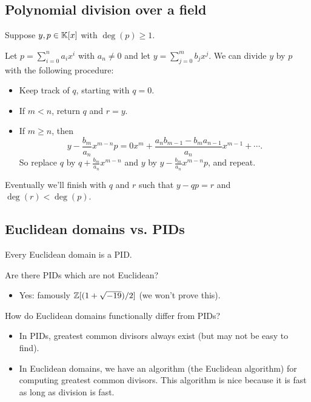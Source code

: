 \documentclass[12pt,letterpaper]{report}
\begin{document}
\pagebreak
\subsection{Polynomial division over a field}

Suppose $y, p \in \mathbb{K}[x]$ with $\deg(p) \geq 1$.

Let $p = \sum_{i = 0}^n a_i x^i$ with $a_n \neq 0$ and let $y = \sum_{j = 0}^m b_j x^j$.
We can divide $y$ by $p$ with the following procedure:
\begin{itemize}
  \item Keep track of $q$, starting with $q = 0$.
  \item If $m < n$, return $q$ and $r = y$.
  \item If $m \geq n$, then
  \[
    y - \frac{b_m}{a_n} x^{m - n} p
      = 0x^m + \frac{a_n b_{m - 1} - b_m a_{n - 1}}{a_n} x^{m - 1} + \cdots.
  \]
  So replace $q$ by $q + \frac{b_m}{a_n} x^{m - n}$ and $y$ by $y - \frac{b_m}{a_n} x^{m - n} p$,
  and repeat.
\end{itemize}
Eventually we'll finish with $q$ and $r$ such that $y - qp = r$ and $\deg(r) < \deg(p)$.

\pagebreak
\subsection{Euclidean domains vs. PIDs}

Every Euclidean domain is a PID.

Are there PIDs which are not Euclidean?
\begin{itemize}
  \item Yes: famously $\mathbb{Z}[(1 + \sqrt{-19})/2]$ (we won't prove this).
\end{itemize}

How do Euclidean domains functionally differ from PIDs?
\begin{itemize}
  \item In PIDs, greatest common divisors always exist (but may not be easy to find).
  \item In Euclidean domains, we have an algorithm (the Euclidean algorithm) for computing
    greatest common divisors.
    This algorithm is nice because it is fast as long as division is fast.
\end{itemize}

\end{document}
